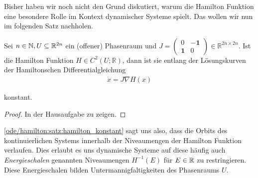 \par
Bisher haben wir noch nicht den Grund diskutiert, warum die Hamilton Funktion eine besondere Rolle im Kontext dynamischer Systeme spielt.
Das wollen wir nun im folgenden Satz nachholen.
\label{ode/hamilton:satz:hamilton_konstant}
\begin{theorem}{}{}



\par
Sei \(n\in \mathbb{N}, U \subseteq \mathbb{R}^{2n}\) ein (offener) Phasenraum und \(J= \begin{pmatrix} 0 & - \mathbf{1} \\ \mathbf{1} & 0 \end{pmatrix} \in \mathbb{R}^{2n \times 2n}\).
Ist die Hamilton Funktion \(H \in C^2(U; \mathbb{R})\), dann ist sie entlang der Lösungskurven der Hamiltonschen Differentialgleichung
\begin{align*}
\dot x = J \nabla H(x)
\end{align*}
\par
konstant.
\end{theorem}

\begin{proof}
 In der Hausaufgabe zu zeigen.
\end{proof}

\par
\cref{ode/hamilton:satz:hamilton_konstant} sagt uns also, dass die Orbits des kontinuierlichen Systems innerhalb der Niveaumengen der Hamilton Funktion verlaufen.
Dies erlaubt es uns dynamische Systeme auf diese häufig auch \emph{Energieschalen} genannten Niveaumengen \(H^{-1}(E)\) für \(E \in \mathbb{R}\) zu restringieren.
Diese Energieschalen bilden Untermannigfaltigkeiten des Phasenraums \(U\).

